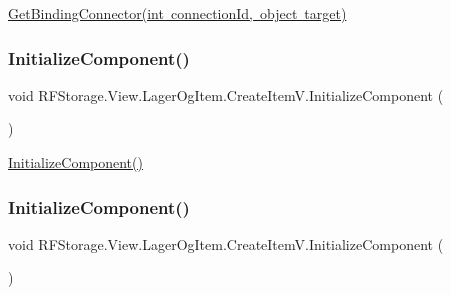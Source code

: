\mbox{\hyperlink{class_r_f_storage_1_1_view_1_1_lager_og_item_1_1_create_item_v_a1d517cdbb57baa678467edcba7a2c6d6}{Get\+Binding\+Connector(int connection\+Id, object target)}} 

\mbox{\label{class_r_f_storage_1_1_view_1_1_lager_og_item_1_1_create_item_v_ab6c7e50ca58f3a267d0015a59848b72d}} 
\subsubsection{\texorpdfstring{InitializeComponent()}{InitializeComponent()}\hspace{0.1cm}{\footnotesize\ttfamily [1/8]}}
{\footnotesize\ttfamily void R\+F\+Storage.\+View.\+Lager\+Og\+Item.\+Create\+Item\+V.\+Initialize\+Component (\begin{DoxyParamCaption}{ }\end{DoxyParamCaption})}



\mbox{\hyperlink{class_r_f_storage_1_1_view_1_1_lager_og_item_1_1_create_item_v_ab6c7e50ca58f3a267d0015a59848b72d}{Initialize\+Component()}} 

\mbox{\label{class_r_f_storage_1_1_view_1_1_lager_og_item_1_1_create_item_v_ab6c7e50ca58f3a267d0015a59848b72d}} 
\subsubsection{\texorpdfstring{InitializeComponent()}{InitializeComponent()}\hspace{0.1cm}{\footnotesize\ttfamily [2/8]}}
{\footnotesize\ttfamily void R\+F\+Storage.\+View.\+Lager\+Og\+Item.\+Create\+Item\+V.\+Initialize\+Component (\begin{DoxyParamCaption}{ }\end{DoxyParamCaption})}



